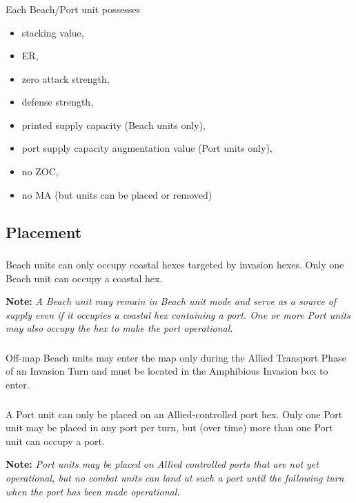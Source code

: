 \subsubsection{}
Each Beach/Port unit possesses
\begin{itemize}
    \item stacking value,
    \item ER,
    \item zero attack strength,
    \item defense strength,
    \item printed supply capacity (Beach units only),
    \item port supply capacity augmentation value (Port units only),
    \item no ZOC,
    \item no MA (but units can be placed or removed)
\end{itemize}

\subsection{Placement}
\subsubsection{}
Beach units can only occupy coastal hexes targeted by invasion hexes. Only one Beach unit can occupy a coastal hex.

\textbf{Note:} \textit{A Beach unit may remain in Beach unit mode and serve as a source of supply even if it occupies a coastal hex containing a port. One or more Port units may also occupy the hex to make the port operational.}

\subsubsection{}
Off-map Beach units may enter the map only during the Allied Transport Phase of an Invasion Turn and must be located in the Amphibious Invasion box to enter.

\subsubsection{}
A Port unit can only be placed on an Allied-controlled port hex. Only one Port unit may be placed in any port per turn, but (over time) more than one Port unit can occupy a port.

\textbf{Note:} \textit{Port units may be placed on Allied controlled ports that are not yet operational, but no combat units can land at such a port until the following turn when the port has been made operational.}

